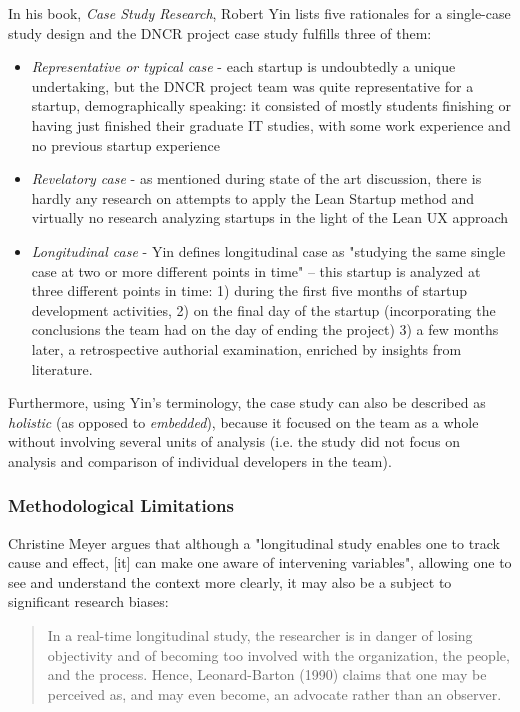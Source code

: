\documentclass{article}
\begin{document}
In his book, \textit{Case Study Research}\citep{yin2013case}, Robert Yin lists five rationales for a single-case study design and the DNCR project case study fulfills three of them:
\begin{itemize}
\item \textit{Representative or typical case} - each startup is undoubtedly a unique undertaking, but the DNCR project team was quite representative for a startup, demographically speaking: it consisted of mostly students finishing or having just finished their graduate IT studies, with some work experience and no previous startup experience
\item \textit{Revelatory case} - as mentioned during state of the art discussion, there is hardly any research on attempts to apply the Lean Startup method and virtually no research analyzing startups in the light of the Lean UX approach
\item \textit{Longitudinal case} - Yin defines longitudinal case as "studying the same single case at two or more different points in time" – this startup is analyzed at three different points in time: 1) during the first five months of startup development activities, 2) on the final day of the startup (incorporating the conclusions the team had on the day of ending the project) 3) a few months later, a retrospective authorial examination, enriched by insights from literature.
\end{itemize}

Furthermore, using Yin's terminology, the case study can also be described as \textit{holistic} (as opposed to \textit{embedded}), because it focused on the team as a whole without involving several units of analysis (i.e. the study did not focus on analysis and comparison of individual developers in the team).

\subsubsection{Methodological Limitations}
Christine Meyer \citep{meyer2001case} argues that although a "longitudinal study enables one to track cause and effect, [it] can make one aware of intervening variables", allowing one to see and understand the context more clearly, it may also be a subject to significant research biases:
\begin{quote}
In a real-time longitudinal study, the researcher is in danger of losing objectivity and of becoming too involved with the organization, the people, and the process. Hence, Leonard-Barton (1990) claims that one may be perceived as, and may even become, an advocate rather than an observer.
\end{quote}
\end{document}
